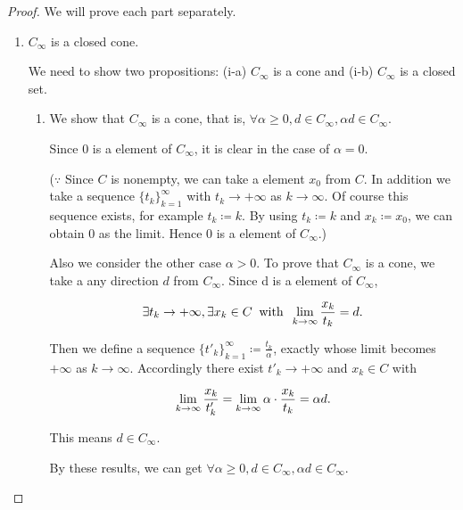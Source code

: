 \documentclass[a4paper,11pt]{jsarticle}
\begin{document}
\begin{proof}
  We will prove each part separately.
  \begin{enumerate}[label=\roman*,align=CenterWithParen]
    \item $C_{\infty}$ is a closed cone.

      We need to show two propositions: (i-a) $C_{\infty}$ is a cone and (i-b) $C_{\infty}$ is a closed set.

      \begin{enumerate}[label=i-\alph*,align=CenterWithParen]
        \item We show that $C_{\infty}$ is a cone, that is, $\forall \alpha \geq 0, d \in C_{\infty}, \alpha d \in C_{\infty}$.

        Since $0$ is a element of $C_{\infty}$, it is clear in the case of $\alpha = 0$.

        ($\because$ Since $C$ is nonempty, we can take a element $x_0$ from $C$. In addition we take a sequence $\{t_k\}_{k=1}^{\infty}$ with $t_k \rightarrow + \infty$ as $k \rightarrow \infty$. Of course this sequence exists, for example $t_k \coloneqq k$. By using $t_k \coloneqq k$ and $x_k \coloneqq x_0$, we can obtain $0$ as the limit. Hence $0$ is a element of $C_{\infty}$.)

        Also we consider the other case $\alpha > 0$. To prove that $C_{\infty}$ is a cone, we take a any direction $d$ from $C_{\infty}$. Since d is a element of $C_{\infty}$,

        \begin{equation}
          \exists t_k \rightarrow + \infty , \exists x_k \in C \:\text{ with }\: \lim_{k \to \infty} \frac{x_k}{t_k} = d. \notag
        \end{equation}

        Then we define a sequence $\{t'_k\}_{k=1}^{\infty} \coloneqq \frac{t_k}{\alpha}$, exactly whose limit becomes $+\infty$ as $k \rightarrow \infty$. Accordingly there exist $t'_k \rightarrow + \infty$ and $x_k \in C$ with

        \begin{equation}
          \lim_{k \to \infty} \frac{x_k}{t'_k} = \lim_{k \to \infty} \alpha \cdot \frac{x_k}{t_k} = \alpha d. \notag
        \end{equation}

        This means $d \in C_{\infty}$.

        By these results, we can get $\forall \alpha \geq 0, d \in C_{\infty}, \alpha d \in C_{\infty}$.


\end{enumerate}
\end{enumerate}
\end{proof}
\end{document}
